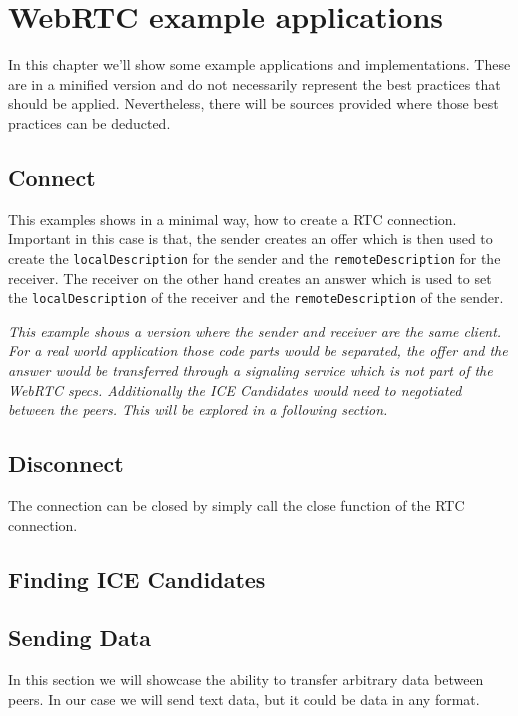 \clearpage
\chapter{WebRTC example applications}
In this chapter we'll show some example applications and implementations. These are in a minified version and do not necessarily represent the best practices that should be applied. Nevertheless, there will be sources provided where those best practices can be deducted.

\section{Connect}
This examples shows in a minimal way, how to create a RTC connection. Important in this case is that, the sender creates an offer which is then used to create the \lstinline[basicstyle=\ttfamily\color{black}]|localDescription| for the sender and the \lstinline[basicstyle=\ttfamily\color{black}]|remoteDescription| for the receiver. The receiver on the other hand creates an answer which is used to set the \lstinline[basicstyle=\ttfamily\color{black}]|localDescription| of the receiver and the \lstinline[basicstyle=\ttfamily\color{black}]|remoteDescription| of the sender.

\textit{This example shows a version where the sender and receiver are the same client. For a real world application those code parts would be separated, the offer and the answer would be transferred through a signaling service which is not part of the WebRTC specs. Additionally the ICE Candidates would need to negotiated between the peers. This will be explored in a following section.}



\section{Disconnect}
The connection can be closed by simply call the close function of the RTC connection.



\section{Finding ICE Candidates}


\section{Sending Data}
In this section we will showcase the ability to transfer arbitrary data between peers. In our case we will send text data, but it could be data in any format.

